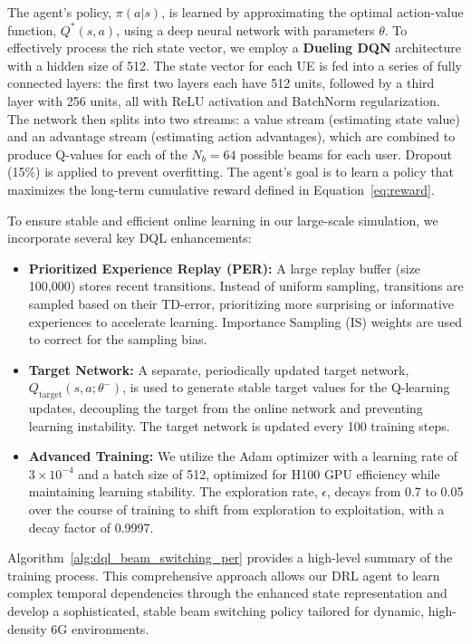 The agent's policy, $\pi(a|s)$, is learned by approximating the optimal action-value function, $Q^*(s,a)$, using a deep neural network with parameters $\theta$. To effectively process the rich state vector, we employ a \textbf{Dueling DQN} architecture with a hidden size of 512. The state vector for each UE is fed into a series of fully connected layers: the first two layers each have 512 units, followed by a third layer with 256 units, all with ReLU activation and BatchNorm regularization. The network then splits into two streams: a value stream (estimating state value) and an advantage stream (estimating action advantages), which are combined to produce Q-values for each of the $N_b=64$ possible beams for each user. Dropout (15\%) is applied to prevent overfitting. The agent's goal is to learn a policy that maximizes the long-term cumulative reward defined in Equation~\eqref{eq:reward}.

To ensure stable and efficient online learning in our large-scale simulation, we incorporate several key DQL enhancements:

\begin{itemize}
    \item \textbf{Prioritized Experience Replay (PER):} A large replay buffer (size 100,000) stores recent transitions. Instead of uniform sampling, transitions are sampled based on their TD-error, prioritizing more surprising or informative experiences to accelerate learning. Importance Sampling (IS) weights are used to correct for the sampling bias.
    
    \item \textbf{Target Network:} A separate, periodically updated target network, $Q_{\text{target}}(s, a; \theta^-)$, is used to generate stable target values for the Q-learning updates, decoupling the target from the online network and preventing learning instability. The target network is updated every 100 training steps.
    
    \item \textbf{Advanced Training:} We utilize the Adam optimizer with a learning rate of $3 \times 10^{-4}$ and a batch size of 512, optimized for H100 GPU efficiency while maintaining learning stability. The exploration rate, $\epsilon$, decays from 0.7 to 0.05 over the course of training to shift from exploration to exploitation, with a decay factor of 0.9997.
\end{itemize}

Algorithm~\ref{alg:dql_beam_switching_per} provides a high-level summary of the training process. This comprehensive approach allows our DRL agent to learn complex temporal dependencies through the enhanced state representation and develop a sophisticated, stable beam switching policy tailored for dynamic, high-density 6G environments.

